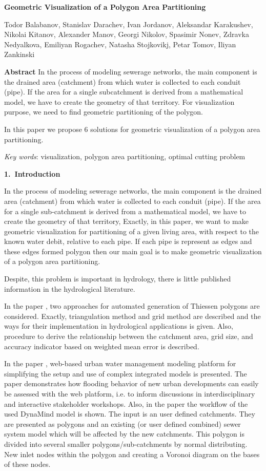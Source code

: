 \documentclass[11pt,leqno]{book}
\newcommand{\sect}[1]{\vskip7mm\par{\large \bf #1}}
\begin{document}
%
\begin{center}
\textbf{\LARGE Geometric Visualization of a Polygon Area Partitioning}

\vspace*{5mm}
%
Todor Balabanov,
Stanislav Darachev,
Ivan Jordanov,
Aleksandar Karakushev,
Nikolai Kitanov,
Alexander Manov,
Georgi Nikolov,
Spasimir Nonev,
Zdravka Nedyalkova,
Emiliyan Rogachev,
Natasha Stojkovikj,
Petar Tomov,
Iliyan Zankinski
%
\end{center}
%
\date{18-22 Sep 2017}
%
\sect{Abstract}
%
In the process of modeling sewerage networks, the main component is the drained area (catchment) from which water is collected to each conduit (pipe). If the area for a single subcatchment is derived from a mathematical model, we have to create the geometry of that territory. For visualization purpose, we need to find geometric partitioning of the polygon.

In this paper we propose 6 solutions for geometric visualization of a polygon area partitioning.

\textit{Key words}: visualization, polygon area partitioning, optimal cutting problem

\sect{1.~Introduction}

In the process of modeling sewerage networks, the main component is the drained area (catchment) from which water is collected to each conduit (pipe). If the area for a single sub-catchment is derived from a mathematical model, we have to create the geometry of that territory, Exactly, in this paper, we want to make geometric visualization for partitioning of a given living area, with respect to the known water debit, relative to each pipe. If each pipe is represent as edges and these edges formed polygon  then our main goal is to make geometric visualization of a polygon area partitioning.  

Despite, this problem is important in hydrology, there is little published information in the hydrological literature. 

In the paper \cite{han:bra:1}, two approaches for automated generation of  Thiessen polygons are considered. Exactly, triangulation method and grid method are described and the ways for their implementation in hydrological applications is given. Also, procedure to derive the relationship between the catchment area, grid size, and accuracy indicator based on weighted mean error is described. 

In the paper \cite{mai:mik:1}, web-based urban water management modeling platform for simplifying the setup and use of complex integrated models is presented.  The paper demonstrates how flooding behavior of new urban developments can easily be assessed with the web platform, i.e. to inform discussions in interdisciplinary and interactive stakeholder workshops. Also, in the paper the workﬂow of the used DynaMind model is shown. The input is an user deﬁned catchments. They are presented as polygons and an existing (or user deﬁned combined) sewer system model which will be affected by the new catchments. This polygon is divided into several smaller polygons/sub-catchments by normal distributing. New inlet nodes within the polygon and creating a Voronoi diagram on the bases of these nodes. 
\end{document}
